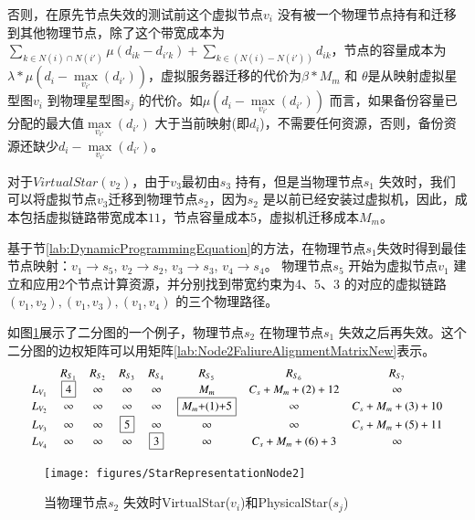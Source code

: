 否则，在原先节点失效的测试前这个虚拟节点$v_i$ 没有被一个物理节点持有和迁移到其他物理节点，除了这个带宽成本为${\sum\limits_{k \in N(i) \cap N(i')} {\mu({d_{ik}} - {d_{i'k}})}  + \sum\limits_{k \in \left( {N(i) - N(i')} \right)} {{d_{ik}}} }$，节点的容量成本为${\lambda * \mu({d_i} - \mathop {\max }\limits_{{v_{i'}}} \left( {{d_{i'}}} \right))}$，虚拟服务器迁移的代价为${\beta * {M_m}}$ 和 $\theta$是从映射虚拟星型图$v_i$ 到物理星型图$s_j$ 的代价。如${\mu({d_i} - \mathop {\max }\limits_{{v_{i'}}} \left( {{d_{i'}}} \right))}$ 而言，如果备份容量已分配的最大值${\mathop {\max }\limits_{{v_{i'}}} \left( {{d_{i'}}} \right)}$ 大于当前映射(即$d_i$)，不需要任何资源，否则，备份资源还缺少${{d_i} - \mathop {\max }\limits_{{v_{i'}}} \left( {{d_{i'}}} \right)}$。

对于$VirtualStar(v_2)$，由于$v_3$最初由$s_3$ 持有，但是当物理节点$s_1$ 失效时，我们可以将虚拟节点$v_3$迁移到物理节点$s_2$，因为$s_2$ 是以前已经安装过虚拟机，因此，成本包括虚拟链路带宽成本$11$，节点容量成本5，虚拟机迁移成本$M_m$。

基于节\ref{lab:DynamicProgrammingEquation}的方法，在物理节点$s_1$失效时得到最佳节点映射：$v_1 \rightarrow s_5$, $v_2 \rightarrow s_2$, $v_3 \rightarrow s_3$, $v_4 \rightarrow s_4$。 物理节点$s_5$ 开始为虚拟节点$v_1$ 建立和应用2个节点计算资源，并分别找到带宽约束为4、5、3 的对应的虚拟链路$(v_1,v_2),(v_1,v_3),(v_1,v_4)$ 的三个物理路径。

如图\ref{fig:StarRepresentationNode2}展示了二分图的一个例子，物理节点$s_2$ 在物理节点$s_1$ 失效之后再失效。这个二分图的边权矩阵可以用矩阵\ref{lab:Node2FaliureAlignmentMatrixNew}表示。
\begin{equation*}
\small{
 {\begin{array}{*{20}{c}}
&R_{S_{1}}&R_{S_{2}}&R_{S_3}&R_{S_4}&R_{S_5}&R_{S_6}&R_{S_{7}}\\
{L_{V_1}}&\fbox{4}&\infty&\infty&\infty&M_{m}&C_{s}+M_{m}+(2)+12&\infty\\
L_{V_2}&\infty&\infty&\infty&\infty&\fbox{$M_{m}$+(1)+5}&\infty&C_{s}+M_{m}+(3)+10\\
L_{V_3}&\infty&\infty&\fbox{5}&\infty&\infty&\infty&C_{s}+M_{m}+(5)+11\\
L_{V_4}&\infty&\infty&\infty&\fbox{3}&\infty&C_{s}+M_{m}+(6)+3&\infty\\
\end{array}}
}
\label{lab:Node2FaliureAlignmentMatrixNew}
\end{equation*}

\begin{figure}[htbp]
\centering
\texttt{[image: figures/StarRepresentationNode2]}\\
  \caption{当物理节点$s_2$ 失效时VirtualStar($v_i$)和PhysicalStar($s_j$)}\label{fig:StarRepresentationNode2}
\end{figure}

